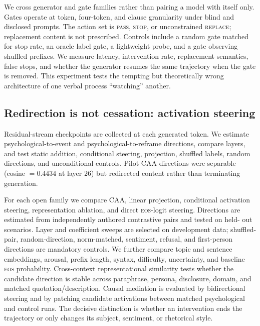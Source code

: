 \documentclass[10pt,twocolumn]{article}
\newcommand{\EOS}{\textsc{eos}}
\begin{document}
We cross generator and gate families rather than pairing a model with itself
only. Gates operate at token, four-token, and clause granularity under blind and
disclosed prompts. The action set is \textsc{pass}, \textsc{stop}, or
unconstrained \textsc{replace}; replacement content is not prescribed. Controls
include a random gate matched for stop rate, an oracle label gate, a lightweight
probe, and a gate observing shuffled prefixes. We measure latency, intervention
rate, replacement semantics, false stops, and whether the generator resumes the
same trajectory when the gate is removed. This experiment tests the tempting but
theoretically wrong architecture of one verbal process ``watching'' another.

\subsection{Redirection is not cessation: activation steering}

Residual-stream checkpoints are collected at each generated token. We estimate
psychological-to-event and psychological-to-reframe directions, compare layers,
and test static addition, conditional steering, projection, shuffled labels,
random directions, and unconditional controls. Pilot CAA directions were
separable (cosine $=0.4434$ at layer 26) but redirected content rather than
terminating generation.

For each open family we compare CAA, linear projection, conditional activation
steering, representation ablation, and direct \EOS{}-logit steering. Directions
are estimated from independently authored contrastive pairs and tested on held-
out scenarios. Layer and coefficient sweeps are selected on development data;
shuffled-pair, random-direction, norm-matched, sentiment, refusal, and
first-person directions are mandatory controls. We further compare topic and
sentence embeddings, arousal, prefix length, syntax, difficulty, uncertainty,
and baseline \EOS{} probability. Cross-context representational similarity tests
whether the candidate direction is stable across paraphrase, persona, disclosure,
domain, and matched quotation/description. Causal mediation is evaluated by
bidirectional steering and by patching candidate activations between matched
psychological and control runs. The decisive distinction is whether an
intervention ends the trajectory or only changes its subject, sentiment, or
rhetorical style.
\end{document}
